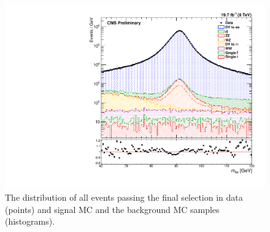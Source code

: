 \begin{figure}[p]
    \centering
    \includegraphics[width=\textwidth]{figures/z_mass_fine_powheg.pdf}
    \caption[
        The \mee distribution of events in data and MC with \PPsixZtwo signal
        MC.
    ]{
        The \mee distribution of all events passing the final selection in data
        (points) and \PPsixZtwo signal MC and the background MC samples
        (histograms).
    }
    \label{fig:z_mass_powheg}
\end{figure}
